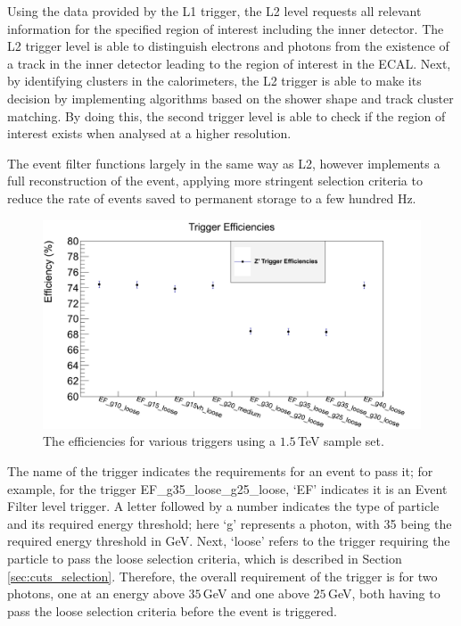 \documentclass{article}
\begin{document}
Using the data provided by the L1 trigger, the L2 level requests all relevant information for the specified region of interest including the inner detector. The L2 trigger level is able to distinguish electrons and photons from the existence of a track in the inner detector leading to the region of interest in the ECAL. Next, by identifying clusters in the calorimeters, the L2 trigger is able to make its decision by implementing algorithms based on the shower shape and track cluster matching. By doing this, the second trigger level is able to check if the region of interest exists when analysed at a higher resolution.

The event filter functions largely in the same way as L2, however implements a full reconstruction of the event, applying more stringent selection criteria to reduce the rate of events saved to permanent storage to a few hundred Hz.

\begin{figure}[h]
    \centering \includegraphics[scale=0.27]{images/TriggerEfficiencies.png} \caption{The efficiencies for various triggers using a $1.5\,$TeV sample set. \label{fig:TriggerZ} }
\end{figure}

The name of the trigger indicates the requirements for an event to pass it; for example, for the trigger EF\_g35\_loose\_g25\_loose, `EF' indicates it is an Event Filter level trigger. A letter followed by a number indicates the type of particle and its required energy threshold; here `g' represents a photon, with 35  being the required energy threshold in GeV. Next, `loose' refers to the trigger requiring the particle to pass the loose selection criteria, which is described in Section \ref{sec:cuts_selection}. Therefore, the overall requirement of the trigger is for two photons, one at an energy above $35\,$GeV and one above $25\,$GeV, both having to pass the loose selection criteria before the event is triggered. 
\end{document}
